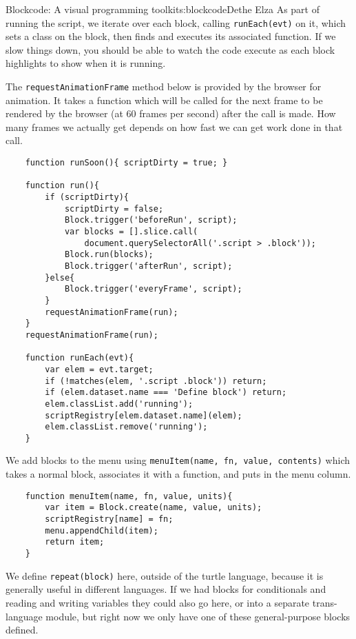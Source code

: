 \begin{aosachapter}{Blockcode: A visual programming toolkit}{s:blockcode}{Dethe Elza}
As part of running the script, we iterate over each block, calling
\texttt{runEach(evt)} on it, which sets a class on the block, then finds
and executes its associated function. If we slow things down, you should
be able to watch the code execute as each block highlights to show when
it is running.

The \texttt{requestAnimationFrame} method below is provided by the
browser for animation. It takes a function which will be called for the
next frame to be rendered by the browser (at 60 frames per second) after
the call is made. How many frames we actually get depends on how fast we
can get work done in that call.

\begin{verbatim}
    function runSoon(){ scriptDirty = true; }

    function run(){
        if (scriptDirty){
            scriptDirty = false;
            Block.trigger('beforeRun', script);
            var blocks = [].slice.call(
                document.querySelectorAll('.script > .block'));
            Block.run(blocks);
            Block.trigger('afterRun', script);
        }else{
            Block.trigger('everyFrame', script);
        }
        requestAnimationFrame(run);
    }
    requestAnimationFrame(run);

    function runEach(evt){
        var elem = evt.target;
        if (!matches(elem, '.script .block')) return;
        if (elem.dataset.name === 'Define block') return;
        elem.classList.add('running');
        scriptRegistry[elem.dataset.name](elem);
        elem.classList.remove('running');
    }
\end{verbatim}

We add blocks to the menu using
\texttt{menuItem(name, fn, value, contents)} which takes a normal block,
associates it with a function, and puts in the menu column.

\begin{verbatim}
    function menuItem(name, fn, value, units){
        var item = Block.create(name, value, units);
        scriptRegistry[name] = fn;
        menu.appendChild(item);
        return item;
    }
\end{verbatim}

We define \texttt{repeat(block)} here, outside of the turtle language,
because it is generally useful in different languages. If we had blocks
for conditionals and reading and writing variables they could also go
here, or into a separate trans-language module, but right now we only
have one of these general-purpose blocks defined.


\end{aosachapter}
